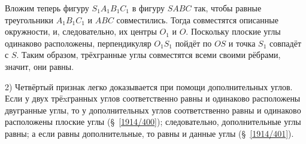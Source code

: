 {Вложим теперь фигуру $S_1A_1B_1C_1$ в фигуру $SABC$ так, чтобы равные треугольники $A_1B_1C_1$ и $ABC$ совместились.
Тогда совместятся описанные окружности, и, следовательно, их центры $O_1$ и $O$.
Поскольку плоские углы одинаково расположены, перпендикуляр $O_1S_1$ пойдёт по $OS$ и точка $S_1$ совпадёт с $S$.
Таким образом, трёхгранные углы совместятся всеми своими рёбрами, значит, они равны.

2) Четвёртый признак легко доказывается при помощи дополнительных углов.
Если у двух трёxгранных углов соответственно равны и одинаково расположены двугранные углы, то у дополнительных углов соответственно равны и одинаково расположены плоские углы (§~\ref{1914/400});
следовательно, дополнительные углы равны; а если равны дополнительные, то равны и данные углы (§~\ref{1914/401}).

}

